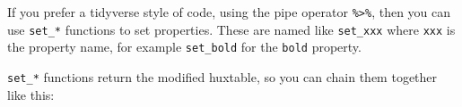 \documentclass[]{article}
\newenvironment{Shaded}{\begin{snugshade}}{\end{snugshade}}
\newcommand{\DataTypeTok}[1]{\textcolor[rgb]{0.13,0.29,0.53}{#1}}
\newcommand{\DecValTok}[1]{\textcolor[rgb]{0.00,0.00,0.81}{#1}}
\newcommand{\KeywordTok}[1]{\textcolor[rgb]{0.13,0.29,0.53}{\textbf{#1}}}
\newcommand{\NormalTok}[1]{#1}
\newcommand{\OperatorTok}[1]{\textcolor[rgb]{0.81,0.36,0.00}{\textbf{#1}}}
\newcommand{\OtherTok}[1]{\textcolor[rgb]{0.56,0.35,0.01}{#1}}
\newcommand{\StringTok}[1]{\textcolor[rgb]{0.31,0.60,0.02}{#1}}
\begin{document}
If you prefer a tidyverse style of code, using the pipe operator
\texttt{\%\textgreater{}\%}, then you can use \texttt{set\_*} functions
to set properties. These are named like \texttt{set\_xxx} where
\texttt{xxx} is the property name, for example \texttt{set\_bold} for
the \texttt{bold} property.

\texttt{set\_*} functions return the modified huxtable, so you can chain
them together like this:

\begin{Shaded}
\end{Shaded}

 
  \providecommand{\huxb}[2]{\arrayrulecolor[RGB]{#1}\global\arrayrulewidth=#2pt}
  \providecommand{\huxvb}[2]{\color[RGB]{#1}\vrule width #2pt}
  \providecommand{\huxtpad}[1]{\rule{0pt}{\baselineskip+#1}}
  \providecommand{\huxbpad}[1]{\rule[-#1]{0pt}{#1}}
\end{document}
